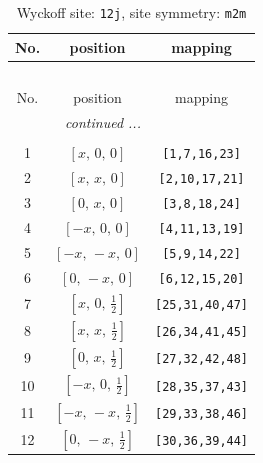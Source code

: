 \documentclass[fleqn,8pt]{jsarticle}
\begin{document}
\begin{longtable}{ccc}
\caption{Wyckoff site: {\tt 12j}, site symmetry: {\tt m2m}}
 \\
 \hline \hline
No. & position & mapping \\ \hline \endfirsthead

\multicolumn{2}{l}{\tablename\ \thetable{}} \\
 \hline \hline
No. & position & mapping \\ \hline \endhead

 \hline \hline
\multicolumn{2}{r}{\footnotesize\it continued ...} \\ \endfoot

 \hline \hline
\multicolumn{2}{r}{} \\ \endlastfoot

1 & $\left[ x,\, 0,\, 0 \right]$ & {\tt [1,7,16,23]} \\ \hline
2 & $\left[ x,\, x,\, 0 \right]$ & {\tt [2,10,17,21]} \\ \hline
3 & $\left[ 0,\, x,\, 0 \right]$ & {\tt [3,8,18,24]} \\ \hline
4 & $\left[ - x,\, 0,\, 0 \right]$ & {\tt [4,11,13,19]} \\ \hline
5 & $\left[ - x,\, - x,\, 0 \right]$ & {\tt [5,9,14,22]} \\ \hline
6 & $\left[ 0,\, - x,\, 0 \right]$ & {\tt [6,12,15,20]} \\ \hline
7 & $\left[ x,\, 0,\, \frac{1}{2} \right]$ & {\tt [25,31,40,47]} \\ \hline
8 & $\left[ x,\, x,\, \frac{1}{2} \right]$ & {\tt [26,34,41,45]} \\ \hline
9 & $\left[ 0,\, x,\, \frac{1}{2} \right]$ & {\tt [27,32,42,48]} \\ \hline
10 & $\left[ - x,\, 0,\, \frac{1}{2} \right]$ & {\tt [28,35,37,43]} \\ \hline
11 & $\left[ - x,\, - x,\, \frac{1}{2} \right]$ & {\tt [29,33,38,46]} \\ \hline
12 & $\left[ 0,\, - x,\, \frac{1}{2} \right]$ & {\tt [30,36,39,44]} \\
\end{longtable}
\renewcommand{\arraystretch}{1.2}
\end{document}
